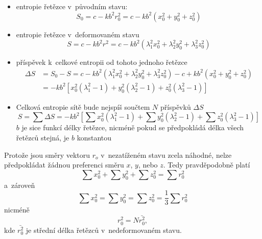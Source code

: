 \begin{itemize}
	\item entropie řetězce v~původním stavu:
	\begin{equation}
		S_0 = c - k b^2 r_0^2 = c - k b^2 (x_0^2 + y_0^2 + z_0^2)
	\end{equation}
	\item entropie řetězce v~deformovaném stavu
	\begin{equation}
		S = c - k b^2 r^2 = c - k b^2 (\lambda_1^2 x_0^2 + \lambda_2^2 y_0^2 + \lambda_3^2 z_0^2)
	\end{equation}
	\item příspěvek k~celkové entropii od tohoto jednoho řetězce
	\begin{equation}\begin{split}
		\Delta S &= S_0 - S
		= c - k b^2 (\lambda_1^2 x_0^2 + \lambda_2^2 y_0^2 + \lambda_3^2 z_0^2)
		- c + k b^2 (x_0^2 + y_0^2 + z_0^2)\\
		&= - k b^2 \left[ x_0^2(\lambda_1^2-1) + y_0^2(\lambda_2^2-1) + z_0^2(\lambda_3^2-1) \right]
	\end{split}\end{equation}
	\item Celková entropie sítě bude nejspíš součtem $N$ příspěvků $\Delta S$
	\begin{equation}
		S = \sum \Delta S = - k b^2 \left[ \sum x_0^2(\lambda_1^2-1) + \sum y_0^2(\lambda_2^2-1) + \sum z_0^2(\lambda_3^2-1) \right]
	\end{equation}
	$b$ je sice funkcí délky řetězce, nicméně pokud se předpokládá délka všech řetězců stejná, je $b$ konstantou
\end{itemize}

Protože jsou směry vektoru $r_o$ v~nezatíženém stavu zcela náhodné, nelze předpokládat žádnou preferenci směru $x$, $y$, nebo $z$. Tedy pravděpodobně platí
\begin{equation}
	\sum x_0^2 + \sum y_0^2 + \sum z_0^2 = \sum r_0^2
\end{equation}
a~zároveň
\begin{equation}
	\sum x_0^2 = \sum y_0^2 = \sum z_0^2 = \frac{1}{3} \sum r_0^2
\end{equation}
nicméně
\begin{equation}
	r_0^2 = N \bar{r_0^2},
\end{equation}
kde $\bar{r_0^2}$ je střední délka řetězců v~nedeformovaném stavu.


